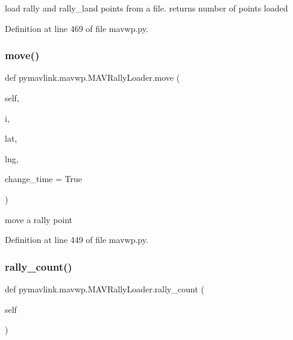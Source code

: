 \begin{DoxyVerb}load rally and rally_land points from a file.
 returns number of points loaded\end{DoxyVerb}
 

Definition at line 469 of file mavwp.\+py.

\mbox{\label{classpymavlink_1_1mavwp_1_1MAVRallyLoader_a42e1d8a77c00ac327e9438a5439f5778}} 
\subsubsection{\texorpdfstring{move()}{move()}}
{\footnotesize\ttfamily def pymavlink.\+mavwp.\+M\+A\+V\+Rally\+Loader.\+move (\begin{DoxyParamCaption}\item[{}]{self,  }\item[{}]{i,  }\item[{}]{lat,  }\item[{}]{lng,  }\item[{}]{change\+\_\+time = {\ttfamily True} }\end{DoxyParamCaption})}

\begin{DoxyVerb}move a rally point\end{DoxyVerb}
 

Definition at line 449 of file mavwp.\+py.

\mbox{\label{classpymavlink_1_1mavwp_1_1MAVRallyLoader_ac740bccce1976db42e9dbbced54fb8ed}} 
\subsubsection{\texorpdfstring{rally\_count()}{rally\_count()}}
{\footnotesize\ttfamily def pymavlink.\+mavwp.\+M\+A\+V\+Rally\+Loader.\+rally\+\_\+count (\begin{DoxyParamCaption}\item[{}]{self }\end{DoxyParamCaption})}

